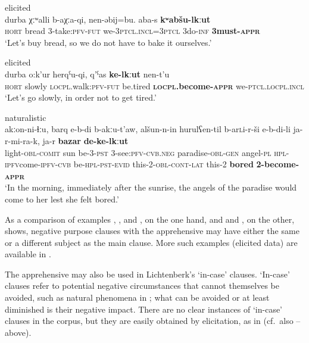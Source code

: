 \documentclass[output=paper,colorlinks,citecolor=brown]{langscibook}
\begin{document}
\ea \label{ex:DD17} \textnormal{elicited} \\
\gll durba χːʷalli b-aχːa-qi, nen-ə{\textlangle}b{\textrangle}ij=bu. a{\textlangle}b{\textrangle}a-s \textbf{kʷa{\textlangle}b{\textrangle}šu-lkːut} \\
\textsc{hort} bread 3-take:\textsc{pfv-fut} we-{\textlangle}3{\textrangle}\textsc{ptcl.incl}={\textlangle}3{\textrangle}\textsc{ptcl} {\textlangle}3{\textrangle}do-\textsc{inf} \textbf{{\textlangle}3{\textrangle}must-\textsc{appr}} \\
\glt `Let's buy bread, so we do not have to bake it ourselves.'
\z


\ea \label{ex:DD18} \textnormal{elicited} \\
\gll durba o:k'ur herqˁu-qi, q'ˁas \textbf{ke-lkːut} nen-t'u \\
\textsc{hort} slowly \textsc{locpl}.walk:\textsc{pfv-fut} be.tired \textbf{\textsc{locpl}.become-\textsc{appr}} we-\textsc{ptcl.locpl.incl} \\
\glt `Let's go slowly, in order not to get tired.'
\z

    \ea \label{ex:DD19} \textnormal{naturalistic}\\
\gll akːon-ni-ɬːu, barq e-b-di b-akːu-t'aw, alšun-n-in hurulʕen-til b-a{\textlangle}r{\textrangle}\textsc{l}i-r-ši e-b-di-li ja-r-mi-ra-k, ja-r \textbf{bazar} \textbf{de-ke-lkːut} \\
light-\textsc{obl-comit} sun be-3-\textsc{pst} 3-see:\textsc{pfv-cvb.neg} paradise-\textsc{obl-gen} angel-\textsc{pl} \textsc{hpl}-{\textlangle}\textsc{ipfv}{\textrangle}come-\textsc{ipfv-cvb} be-\textsc{hpl-pst-evid} this-2-\textsc{obl-cont-lat} this-2 \textbf{bored} \textbf{2-become-\textsc{appr}} \\
\glt `In the morning, immediately after the sunrise, the angels of the paradise would come to her lest she felt bored.'
\z


 As a comparison of examples , ,  and , on the one hand, and  and , on the other, shows, negative purpose clauses with the apprehensive may have either the same or a different subject as the main clause. More such examples (elicited data) are available in \citet[292]{Kibrik1977}.

The apprehensive may also be used in Lichtenberk's `in-case' clauses. `In-case' clauses refer to potential negative circumstances that cannot themselves be avoided, such as natural phenomena in ; what can be avoided or at least diminished is their negative impact. There are no clear instances of `in-case' clauses in the corpus, but they are easily obtained by elicitation, as in  (cf.\ also -- above).
\end{document}
